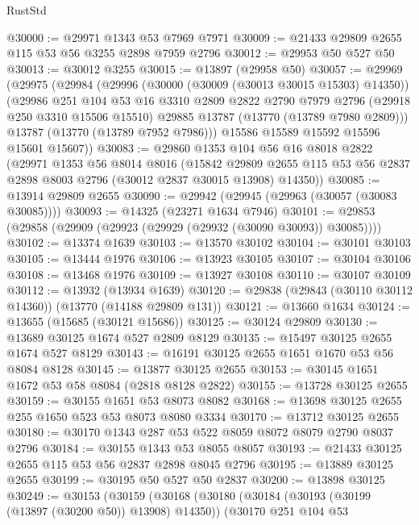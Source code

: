 \begin{lexlean}{RustStd}
\begin{coremodule}
@30000 := @29971 @1343 @53 @7969 @7971
@30009 := @21433 @29809 @2655 @115 @53 @56 @3255 @2898 @7959 @2796
@30012 := @29953 @50 @527 @50
@30013 := @30012 @3255
@30015 := @13897 (@29958 @50)
@30057 := @29969
    (@29975
      (@29984
        (@29996
          (@30000 (@30009 (@30013 @30015 @15303) @14350))
          (@29986
            @251
            @104
            @53
            @16
            @3310
            @2809
            @2822
            @2790
            @7979
            @2796
            (@29918 @250 @3310 @15506 @15510)
            @29885
            @13787
            (@13770 (@13789 @7980 @2809)))
          @13787
          (@13770 (@13789 @7952 @7986)))
        @15586
        @15589
        @15592
        @15596
        @15601
        @15607))
@30083 := @29860
    @1353
    @104
    @56
    @16
    @8018
    @2822
    (@29971
      @1353
      @56
      @8014
      @8016
      (@15842
        @29809
        @2655
        @115
        @53
        @56
        @2837
        @2898
        @8003
        @2796
        (@30012 @2837 @30015 @13908)
        @14350))
@30085 := @13914 @29809 @2655
@30090 := @29942 (@29945 (@29963 (@30057 (@30083 @30085))))
@30093 := @14325 (@23271 @1634 @7946)
@30101 := @29853 (@29858 (@29909 (@29923 (@29929 (@29932 (@30090 @30093)) @30085))))
@30102 := @13374 @1639
@30103 := @13570 @30102
@30104 := @30101 @30103
@30105 := @13444 @1976
@30106 := @13923 @30105
@30107 := @30104 @30106
@30108 := @13468 @1976
@30109 := @13927 @30108
@30110 := @30107 @30109
@30112 := @13932 (@13934 @1639)
@30120 := @29838 (@29843 (@30110 @30112 @14360)) (@13770 (@14188 @29809 @131))
@30121 := @13660 @1634
@30124 := @13655 (@15685 (@30121 @15686))
@30125 := @30124 @29809
@30130 := @13689 @30125 @1674 @527 @2809 @8129
@30135 := @15497 @30125 @2655 @1674 @527 @8129
@30143 := @16191 @30125 @2655 @1651 @1670 @53 @56 @8084 @8128
@30145 := @13877 @30125 @2655
@30153 := @30145 @1651 @1672 @53 @58 @8084 (@2818 @8128 @2822)
@30155 := @13728 @30125 @2655
@30159 := @30155 @1651 @53 @8073 @8082
@30168 := @13698 @30125 @2655 @255 @1650 @523 @53 @8073 @8080 @3334
@30170 := @13712 @30125 @2655
@30180 := @30170 @1343 @287 @53 @522 @8059 @8072 @8079 @2790 @8037 @2796
@30184 := @30155 @1343 @53 @8055 @8057
@30193 := @21433 @30125 @2655 @115 @53 @56 @2837 @2898 @8045 @2796
@30195 := @13889 @30125 @2655
@30199 := @30195 @50 @527 @50 @2837
@30200 := @13898 @30125
@30249 := @30153
    (@30159
      (@30168
        (@30180
          (@30184 (@30193 (@30199 (@13897 (@30200 @50)) @13908) @14350))
          (@30170
            @251
            @104
            @53

\end{coremodule}
\end{lexlean}

